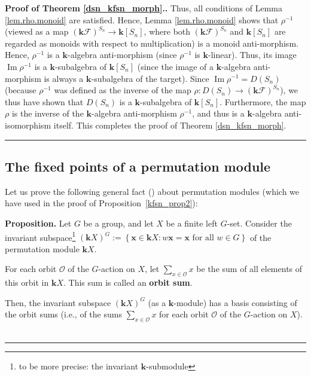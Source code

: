 \documentclass[12pt]{article}
\theoremstyle{definition}%
\newtheorem{prop}[thm]{Proposition}
\theoremstyle{definition}%
\theoremstyle{remark}%
\newcommand{\tup}[1]{\left( #1 \right)}
\newcommand{\set}[1]{\left\{ #1 \right\}}
\newcommand{\kk}{\mathbf{k}}
\newcommand{\ksn}{\kk\left[S_n\right]}
\newcommand{\kf}{\kk\mathcal{F}}
\newcommand{\kfsn}{\left(\kf\right)^{S_n}}
\newcommand{\dsn}{D\left(S_n\right)}
\newcommand{\xx}{\mathbf{x}}
\newcommand{\defin}[1]{\textbf{#1}}
\newenvironment{prop}[1][Proposition]{\noindent\textbf{#1.} }{\ \rule{0.5em}{0.5em}}
\newenvironment{proof}[1][Proof]{\noindent\textbf{#1.} }{\ \rule{0.5em}{0.5em}}
\begin{document}
\begin{proof}[Proof of Theorem \ref{dsn_kfsn_morph}.]
Thus, all conditions of Lemma \ref{lem.rho.monoid} are satisfied.
Hence, Lemma \ref{lem.rho.monoid} shows that $\rho^{-1}$ (viewed as a map
$\kfsn\to\ksn$, where both $\kfsn$
and $\ksn$ are regarded as monoids with respect to
multiplication) is a monoid anti-morphism.
Hence, $\rho^{-1}$ is a
$\kk$-algebra anti-morphism (since $\rho^{-1}$ is $\kk$-linear).
Thus, its image $\operatorname{Im}\rho^{-1}$ is a $\kk$-subalgebra of
$\ksn$ (since the image of a $\kk$-algebra
anti-morphism is always a $\kk$-subalgebra of the target). Since
$\operatorname{Im}\rho^{-1}=\dsn$ (because $\rho^{-1}$ was
defined as the inverse of the map $\rho:\dsn\to\kfsn$),
we thus have shown that
$\dsn$ is a $\kk$-subalgebra of $\ksn$.
Furthermore, the map $\rho$ is the inverse of the
$\kk$-algebra anti-morphism $\rho^{-1}$, and thus is a
$\kk$-algebra anti-isomorphism itself. This completes the proof of Theorem
\ref{dsn_kfsn_morph}.
\end{proof}

\subsection{\label{subsec.omitted_proofs.perm-fix-basis}The fixed points of a permutation module}

Let us prove the following general fact (\cite[\S 3.3.1, \textquotedblleft Invariants of Permutation Representations\textquotedblright]{Lorenz18}) about permutation modules (which we have used in the proof of Proposition~\ref{kfsn_prop2}):

\begin{prop}
\label{prop.perm-fix-basis}
Let $G$ be a group, and let $X$ be a finite left $G$-set.
Consider the invariant subspace\footnote{to be more precise: the invariant $\kk$-submodule} $\tup{\kk X}^G := \set{\xx \in \kk X : w\xx = \xx \text{ for all } w \in G}$ of the permutation module $\kk X$.

For each orbit $\mathcal{O}$ of the $G$-action on $X$, let $\sum_{x \in \mathcal{O}} x$ be the sum of all elements of this orbit in $\kk X$. This sum is called an \defin{orbit sum}.

Then, the invariant subspace $\tup{\kk X}^G$ (as a $\kk$-module) has a basis consisting of the orbit sums (i.e., of the sums $\sum_{x \in \mathcal{O}} x$ for each orbit $\mathcal{O}$ of the $G$-action on $X$).
\end{prop}
\end{document}
